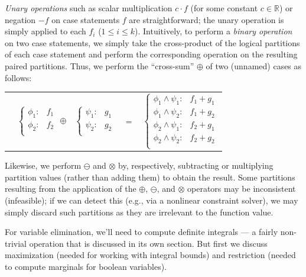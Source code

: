 \documentclass[letterpaper]{article}
\begin{document}
{\emph{Unary operations} such as scalar multiplication $c\cdot f$ (for
some constant $c \in \mathbb{R}$) or negation $-f$ on case statements
$f$ are straightforward; the unary operation is simply applied to each
$f_i$ ($1 \leq i \leq k$). Intuitively, to perform a \emph{binary
  operation} on two case statements, we simply take the cross-product
of the logical partitions of each case statement and perform the
corresponding operation on the resulting paired partitions.  Thus, we 
perform the ``cross-sum'' $\oplus$ of two (unnamed) cases as follows:
\vspace{-4mm}
{\footnotesize 
\begin{center}
\begin{tabular}{r c c c l}
&
\hspace{-6mm} 
  $\begin{cases}
    \phi_1: & f_1 \\ 
    \phi_2: & f_2 \\ 
  \end{cases}$
$\oplus$
&
\hspace{-4mm}
  $\begin{cases}
    \psi_1: & g_1 \\ 
    \psi_2: & g_2 \\ 
  \end{cases}$
&
\hspace{-2mm} 
$ = $
&
\hspace{-2mm}
  $\begin{cases}
  \phi_1 \wedge \psi_1: & f_1 + g_1 \\ 
  \phi_1 \wedge \psi_2: & f_1 + g_2 \\ 
  \phi_2 \wedge \psi_1: & f_2 + g_1 \\ 
  \phi_2 \wedge \psi_2: & f_2 + g_2 \\ 
  \end{cases}$
\end{tabular}
\end{center}
}
\normalsize
Likewise, we perform $\ominus$ and $\otimes$ by,
respectively, subtracting or multiplying partition values (rather than
adding them) to obtain the result.  
Some partitions resulting from
the application of the $\oplus$, $\ominus$, and $\otimes$ operators
may be inconsistent (infeasible); if we can detect this (e.g., via
a nonlinear constraint solver), we may simply discard such 
partitions as they are irrelevant to the function value.

For variable elimination, we'll need to compute definite integrals
 --- a fairly non-trivial operation
that is discussed in its own section.  But first we discuss 
maximization (needed for working with integral bounds) and restriction
(needed to compute marginals for boolean variables).

}
\end{document}
